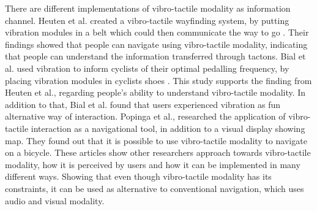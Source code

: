 \documentclass{sigchi}
\begin{document}
\newline
\newline
There are different implementations of vibro-tactile modality as information channel. Heuten et al. created a vibro-tactile wayfinding system, by putting vibration modules in a belt which could then communicate the way to go \cite{heuten08}. Their findings showed that people can navigate using vibro-tactile modality, indicating that people can understand the information transferred through tactons. 
Bial et al. used vibration to inform cyclists of their optimal pedalling frequency, by placing vibration modules in cyclists shoes \cite{bial11}. This study supports the finding from Heuten et al., regarding people's ability to understand vibro-tactile modality. In addition to that, Bial et al. found that users experienced vibration as fun alternative way of interaction. 
\newline
\newline
Popinga et al., researched the application of vibro-tactile interaction as a navigational tool, in addition to a visual display showing map. They found out that it is possible to use vibro-tactile modality to navigate on a bicycle\cite{poppinga09}.
\newline
\newline
These articles show other researchers approach towards vibro-tactile modality, how it is perceived by users and how it can be implemented in many different ways. Showing that even though vibro-tactile modality has its constraints, it can be used as alternative to conventional navigation, which uses audio and visual modality.
\newline
\newline
\end{document}
